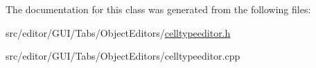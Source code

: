 \-The documentation for this class was generated from the following files\-:\begin{DoxyCompactItemize}
\item 
src/editor/\-G\-U\-I/\-Tabs/\-Object\-Editors/\hyperlink{celltypeeditor_8h}{celltypeeditor.\-h}\item 
src/editor/\-G\-U\-I/\-Tabs/\-Object\-Editors/celltypeeditor.\-cpp\end{DoxyCompactItemize}
